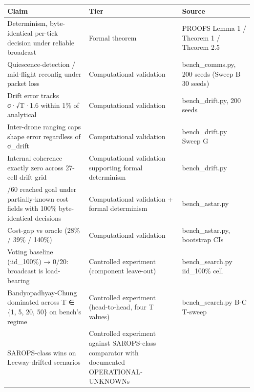 {\def\LTcaptype{none} %
\begin{longtable}[]{@{}
  >{\raggedright\arraybackslash}p{}
  >{\raggedright\arraybackslash}p{}
  >{\raggedright\arraybackslash}p{}@{}}
\toprule\noalign{}
\begin{minipage}[b]{\linewidth}\raggedright
Claim
\end{minipage} & \begin{minipage}[b]{\linewidth}\raggedright
Tier
\end{minipage} & \begin{minipage}[b]{\linewidth}\raggedright
Source
\end{minipage} \\
\midrule\noalign{}
\endhead
\bottomrule\noalign{}
\endlastfoot
Determinism, byte-identical per-tick decision under reliable broadcast &
Formal theorem & PROOFS Lemma 1 / Theorem 1 / Theorem 2.5 \\
Quiescence-detection / mid-flight reconfig under packet loss &
Computational validation & bench\_comms.py, 200 seeds (Sweep B 30
seeds) \\
Drift error tracks σ·√T·1.6 within 1\% of analytical & Computational
validation & bench\_drift.py, 200 seeds \\
Inter-drone ranging caps shape error regardless of σ\_drift &
Computational validation & bench\_drift.py Sweep G \\
Internal coherence exactly zero across 27-cell drift grid &
Computational validation supporting formal determinism &
bench\_drift.py \\
60/60 reached goal under partially-known cost fields with 100\%
byte-identical decisions & Computational validation + formal determinism
& bench\_astar.py \\
Cost-gap vs oracle (28\% / 39\% / 140\%) & Computational validation &
bench\_astar.py, bootstrap CIs \\
Voting baseline (iid\_100\%) → 0/20: broadcast is load-bearing &
Controlled experiment (component leave-out) & bench\_search.py
iid\_100\% cell \\
Bandyopadhyay-Chung dominated across T ∈ \{1, 5, 20, 50\} on bench's
regime & Controlled experiment (head-to-head, four T values) &
bench\_search.py B-C T-sweep \\
SAROPS-class wins on Leeway-drifted scenarios & Controlled experiment
against SAROPS-class comparator with documented OPERATIONAL-UNKNOWNs &

\end{longtable}}
